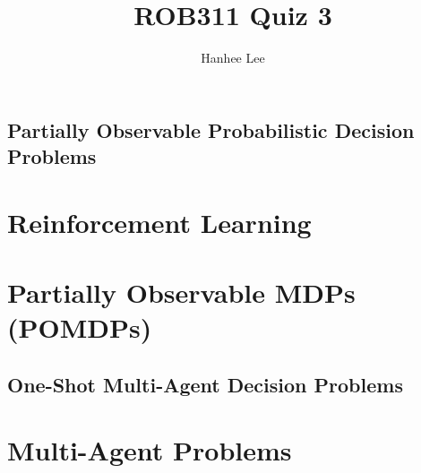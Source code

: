 \documentclass{article}
\title{ROB311 Quiz 3}
\author{Hanhee Lee}
\begin{document}
\maketitle

\tableofcontents
\newpage

\begin{center}
    \section*{Partially Observable Probabilistic Decision Problems}
\end{center}

\section{Reinforcement Learning}

\newpage

\section{Partially Observable MDPs (POMDPs)}

\newpage

\begin{center}
    \section*{One-Shot Multi-Agent Decision Problems}
\end{center}

\section{Multi-Agent Problems}

\newpage
\end{document}
